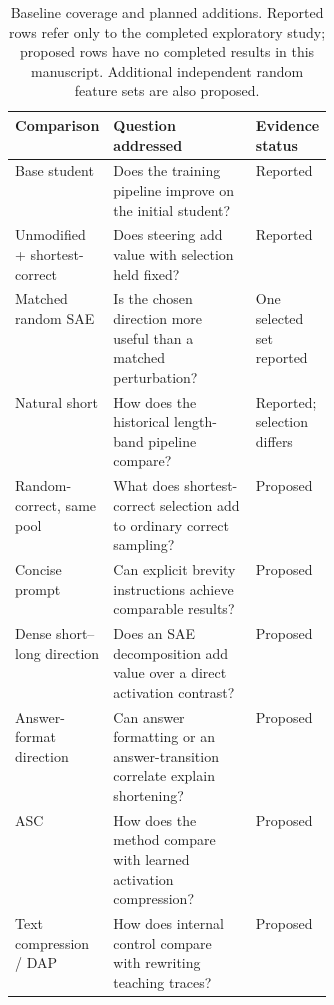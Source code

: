 \begin{table}[t]
\centering
\small
\setlength{\tabcolsep}{4pt}
\begin{tabularx}{\linewidth}{@{}>{\raggedright\arraybackslash}p{0.22\linewidth}>{\raggedright\arraybackslash}X>{\raggedright\arraybackslash}p{0.15\linewidth}@{}}
\toprule
Comparison & Question addressed & Evidence status \\
\midrule
Base student & Does the training pipeline improve on the initial student? & Reported \\
Unmodified + shortest-correct & Does steering add value with selection held fixed? & Reported \\
Matched random SAE & Is the chosen direction more useful than a matched perturbation? & One selected set reported \\
Natural short & How does the historical length-band pipeline compare? & Reported; selection differs \\
Random-correct, same pool & What does shortest-correct selection add to ordinary correct sampling? & Proposed \\
Concise prompt & Can explicit brevity instructions achieve comparable results? & Proposed \\
Dense short--long direction & Does an SAE decomposition add value over a direct activation contrast? & Proposed \\
Answer-format direction & Can answer formatting or an answer-transition correlate explain shortening? & Proposed \\
ASC & How does the method compare with learned activation compression? & Proposed \\
Text compression / DAP & How does internal control compare with rewriting teaching traces? & Proposed \\
\bottomrule
\end{tabularx}
\caption{Baseline coverage and planned additions. Reported rows refer only to the completed exploratory study; proposed rows have no completed results in this manuscript. Additional independent random feature sets are also proposed.}
\label{tab:baseline_design}
\end{table}

